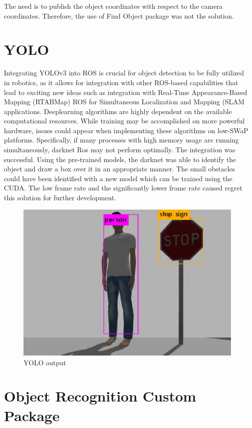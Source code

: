 \documentclass[twoside,12pt,times,onecolumn,a4paper]{report}
\begin{document}
The need is to publish the object coordinates with respect to the camera 
coordinates. Therefore, the use of Find Object package was not the solution.

\section{YOLO}

Integrating YOLOv3 into ROS is crucial for object detection to be fully utilized in 
robotics, as it allows for integration with other ROS-based capabilities that lead to exciting 
new ideas such as integration with Real-Time Appearance-Based Mapping 
(RTABMap) ROS for Simultaneous Localization and Mapping (SLAM applications. Deeplearning algorithms are highly dependent on the available computational resources. While 
training may be accomplished on more powerful hardware, issues could appear when 
implementing these algorithms on low-SWaP platforms. Specifically, if many processes 
with high memory usage are running simultaneously, darknet Ros may not perform 
optimally.
The integration was successful. Using the pre-trained models, the darknet was able 
to identify the object and draw a box over it in an appropriate manner. The small obstacles 
could have been identified with a new model which can be trained using the CUDA. The 
low frame rate and the significantly lower frame rate caused regret this solution for further 
development. 

\begin{figure}[H]
  \centering
   \includegraphics[width=12cm]{yolo}
  \caption{YOLO output}
\end{figure}

\section{Object Recognition Custom Package}
\end{document}
